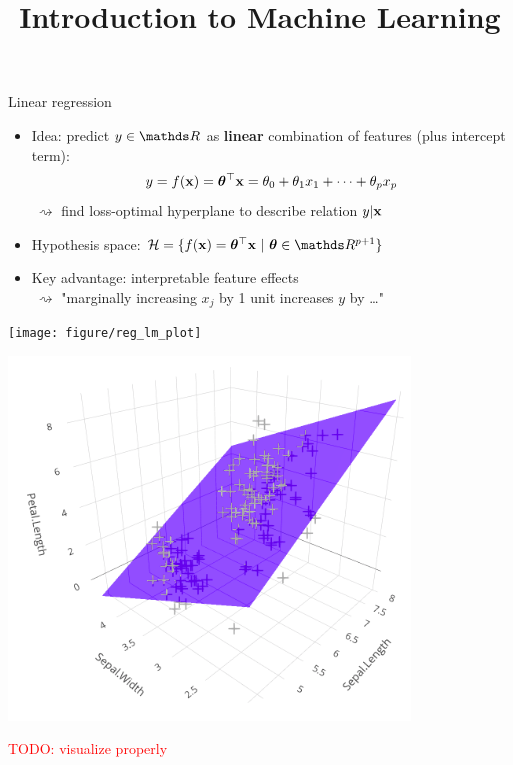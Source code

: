 \documentclass[11pt,compress,t,notes=noshow, xcolor=table]{beamer}
\title{Introduction to Machine Learning}
\institute{\href{https://compstat-lmu.github.io/lecture_i2ml/}{compstat-lmu.github.io/lecture\_i2ml}}
\date{}
\begin{document}

\begin{vbframe}{Linear regression}

\begin{itemize}
    \item Idea: predict $y \in \R$ as \textbf{linear} combination of features
    (plus intercept term):
    $$y = f(\mathbf{x}) = \bm{\theta}^\top \mathbf{x} = \theta_0 + \theta_1 x_1 + \dots + \theta_p x_p$$
    $~\rightsquigarrow$ find loss-optimal hyperplane to describe relation 
    $y | \mathbf{x}$
    \item Hypothesis space: $\Hspace = \{\fx = \thx\ |\ \thetab \in \R^{p+1} \}$
    \item Key advantage: interpretable feature effects \\ $~\rightsquigarrow$
    "marginally increasing $x_j$ by 1 unit increases $y$ by \dots"
    
\end{itemize}
\vfill
    \begin{minipage}{0.45\textwidth}
        \texttt{[image: figure/reg\_lm\_plot]} 
    \end{minipage}
    \hfill
    \begin{minipage}{0.45\textwidth}
        \includegraphics[width=0.8\textwidth]{figure/ss_regr_bivariate} 
        
        \textcolor{red}{TODO: visualize properly}
    \end{minipage}

\end{vbframe}
\end{document}
